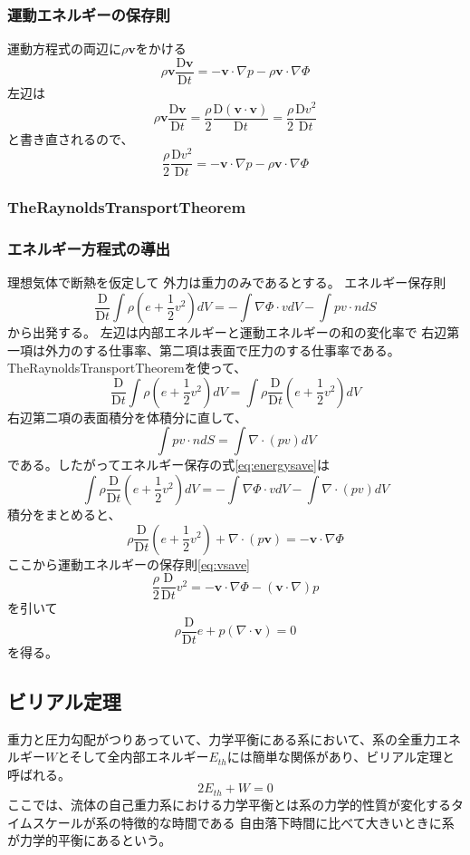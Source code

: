 \documentclass{jsarticle}
\newcommand{\bv}{\mathbf{v}}
\newcommand{\Dder}[2][]{\frac{\mathrm{D}#1}{\mathrm{D}#2}}
\newcommand{\half}{\frac{1}{2}}
\newcommand{\beq}{\begin{equation}}
\newcommand{\eeq}{\end{equation}}
\begin{document}
\subsubsection{運動エネルギーの保存則}
運動方程式の両辺に$\rho\bv$をかける
\beq
    \rho\bv\Dder[\bv]{t} = - \bv\cdot\nabla{p} - \rho\bv\cdot\nabla\Phi
\eeq
左辺は
\beq
\rho\bv\Dder[\bv]{t} = \frac{\rho}{2}\Dder[(\bv \cdot \bv)]{t}= \frac{\rho}{2} \Dder[v^2]{t}
\eeq
と書き直されるので、
\beq
\frac{\rho}{2} \Dder[v^2]{t}= - \bv\cdot\nabla{p} - \rho\bv\cdot\nabla\Phi\label{eq:vsave}
\eeq
\subsubsection{TheRaynoldsTransportTheorem}
\subsubsection{エネルギー方程式の導出}
理想気体で断熱を仮定して
外力は重力のみであるとする。
エネルギー保存則
\beq
\Dder[]{t} \int \rho(e + \half v^2) dV = - \int \nabla\Phi \cdot v dV - \int pv \cdot n dS\label{eq:energysave}
\eeq
から出発する。
左辺は内部エネルギーと運動エネルギーの和の変化率で
右辺第一項は外力のする仕事率、第二項は表面で圧力のする仕事率である。
TheRaynoldsTransportTheoremを使って、
\beq
\Dder[]{t} \int \rho(e + \half v^2) dV  = \int \rho \Dder[]{t} (e + \half v^2)dV   
\eeq    
右辺第二項の表面積分を体積分に直して、
\beq
\int pv \cdot n dS = \int \nabla \cdot (pv) dV
\eeq
である。したがってエネルギー保存の式\eqref{eq:energysave}は
\beq
\int \rho \Dder[]{t} (e + \half v^2)dV =-\int \nabla\Phi\cdot v dV -  \int \nabla \cdot (pv) dV
\eeq
積分をまとめると、
\beq
    \rho \Dder[]{t} (e + \half v^2) + \nabla \cdot (p\bv) = - \bv\cdot \nabla\Phi
\eeq
ここから運動エネルギーの保存則\eqref{eq:vsave}
\beq
\frac{\rho}{2} \Dder[]{t} v^2 = -\bv \cdot \nabla\Phi - (\bv \cdot \nabla) p
\eeq
を引いて
\beq
    \rho \Dder[]{t} e + p (\nabla \cdot \bv) = 0
\eeq
を得る。
\subsection{ビリアル定理}
重力と圧力勾配がつりあっていて、力学平衡にある系において、系の全重力エネルギー$W$とそして全内部エネルギー$E_{th}$には簡単な関係があり、ビリアル定理と呼ばれる。
\begin{equation}
     2E_{th} + W = 0
\end{equation}
ここでは、流体の自己重力系における力学平衡とは系の力学的性質が変化するタイムスケールが系の特徴的な時間である
自由落下時間に比べて大きいときに系が力学的平衡にあるという。
\end{document}
